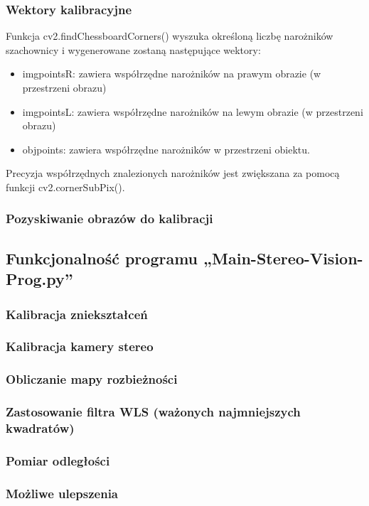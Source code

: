 \documentclass[magisterska]{pracadypl}
\begin{document}
\subsubsection{Wektory kalibracyjne}

Funkcja cv2.findChessboardCorners() wyszuka określoną liczbę narożników szachownicy
i wygenerowane zostaną następujące wektory:

\begin{itemize}
  \item imgpointsR: zawiera współrzędne narożników na prawym obrazie (w przestrzeni obrazu)
  \item imgpointsL: zawiera współrzędne narożników na lewym obrazie (w przestrzeni obrazu)
  \item objpoints: zawiera współrzędne narożników w przestrzeni obiektu.
\end{itemize}

Precyzja współrzędnych znalezionych narożników jest zwiększana za pomocą funkcji
cv2.cornerSubPix().

\subsubsection{Pozyskiwanie obrazów do kalibracji}
\subsection{Funkcjonalność programu „Main-Stereo-Vision-Prog.py”}
\subsubsection{Kalibracja zniekształceń}
\subsubsection{Kalibracja kamery stereo}
\subsubsection{Obliczanie mapy rozbieżności}
\subsubsection{Zastosowanie filtra WLS (ważonych najmniejszych kwadratów)}
\subsubsection{Pomiar odległości}
\subsubsection{Możliwe ulepszenia}
\end{document}
